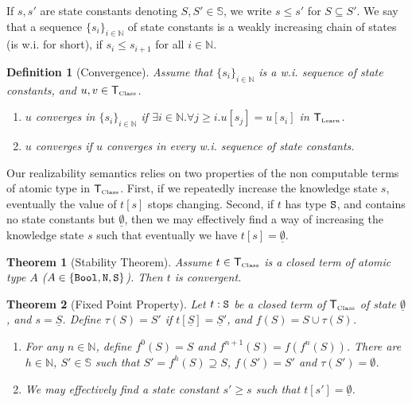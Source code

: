 \documentclass[copyright,creativecommons]{eptcs}
\newcommand{\Nat}                      { {\tt N} }
\newcommand{\Bool}                     { {\tt Bool} }
\newcommand{\State}                    { {\tt S} }
\newcommand{\NatSet}                   {\mathbb{N}}
\newcommand{\StateSet}                 {\mathbb{S}}
\newcommand{\SystemT}                  {\mathsf{T}}
\newcommand{\Class}                    {\mbox{\tiny Class}}
\newcommand{\Learn}                    {\mbox{\tiny Learn}}
\newcommand{\SystemTClass}             {{\SystemT_{\Class}}}
\newcommand{\SystemTLearn}             {{\SystemT_{\Learn}}}
\newcommand{\fix}                      { {f} }
\newcommand{\makestate}      [1]       { {\underline{#1}} }
\newtheorem{theorem}{Theorem}
\newtheorem{definition}{Definition}
\begin{document}
 If $s, s'$ are state constants denoting $S, S' \in \StateSet$, we write $s \le s'$ for $S \subseteq S'$. We say that a sequence $\{s_i\}_{i\in\NatSet}$ of state constants is a weakly increasing chain of states (is w.i. for short), if $s_i\le s_{i+1}$ for all $i\in\NatSet$.

\begin{definition}[Convergence]
\label{definition-Convergence} Assume
that $\{s_i\}_{i\in\NatSet} $ is a w.i. sequence of state constants,
and $u, v \in \SystemTClass$.
\begin{enumerate}

\item
  $u$ converges in $\{s_i\}_{i\in\NatSet}$ if $\exists i\in\NatSet.
\forall j\geq i.u[s_j]=u[s_{i}]$ in $\SystemTLearn$.

\item
$u$ converges if $u$ converges in every w.i. sequence of state constants.
\end{enumerate}
\end{definition}
Our realizability semantics relies on two properties of the non computable terms of atomic type in $\SystemTClass$. First, if we repeatedly increase the knowledge state $s$, eventually the value of $t[s]$ stops changing. Second, if $t$ has type $\State$, and contains no state constants but $\makestate{\emptyset}$, then we may effectively find a way of increasing the knowledge state $s$ such that eventually we have $t[s]=\makestate{\emptyset}$. 
\begin{theorem}[Stability Theorem] \label{theorem-StabilityTheorem}
Assume $t \in \SystemTClass$ is a closed term of atomic type $A$ ($A\in\{\Bool,\Nat,\State\}$). Then $t$ is convergent.
\end{theorem}

\begin{theorem}[Fixed Point Property]\label{Fixed Point Property}
Let $t:\State$ be a closed term of $\SystemTClass$ of state $\makestate{\emptyset}$, and $s = \makestate{S}$. Define $\tau(S) = S'$ if $t[\makestate{S}] = \makestate{S}'$, and $f(S) = S \cup \tau(S)$.
\begin{enumerate}
\item
For any $n\in\NatSet$, define $f^0(S)=S$ and $f^{n+1}(S)=f(f^n(S))$. There are $h\in\NatSet$, $S'\in\StateSet$ such that ${S}' = \fix^h({S})\supseteq S$, $\fix({S}')={S}'$ and $\tau(S') = \emptyset$.
\item
We may effectively find a state constant $s' \ge s$ such that $t[s'] = \makestate{\emptyset}$.
\end{enumerate}
\end{theorem}
\end{document}
